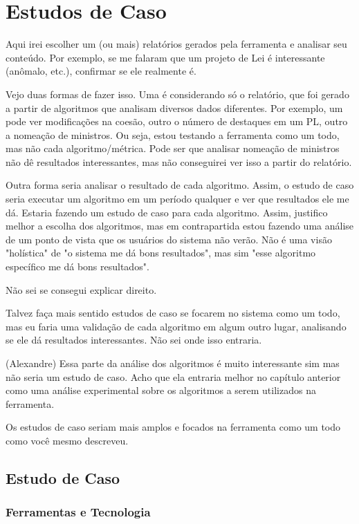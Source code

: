 \chapter{Estudos de Caso}\label{cap:avalia}

Aqui irei escolher um (ou mais) relatórios gerados pela ferramenta e analisar seu conteúdo. Por exemplo, se me falaram que um projeto de Lei é interessante (anômalo, etc.), confirmar se ele realmente é.

Vejo duas formas de fazer isso. Uma é considerando só o relatório, que foi gerado a partir de algoritmos que analisam diversos dados diferentes. Por exemplo, um pode ver modificações na coesão, outro o número de destaques em um PL, outro a nomeação de ministros. Ou seja, estou testando a ferramenta como um todo, mas não cada algoritmo/métrica. Pode ser que analisar nomeação de ministros não dê resultados interessantes, mas não conseguirei ver isso a partir do relatório.

Outra forma seria analisar o resultado de cada algoritmo. Assim, o estudo de caso seria executar um algoritmo em um período qualquer e ver que resultados ele me dá. Estaria fazendo um estudo de caso para cada algoritmo. Assim, justifico melhor a escolha dos algoritmos, mas em contrapartida estou fazendo uma análise de um ponto de vista que os usuários do sistema não verão. Não é uma visão "holística" de "o sistema me dá bons resultados", mas sim "esse algoritmo específico me dá bons resultados".

Não sei se consegui explicar direito.

Talvez faça mais sentido estudos de caso se focarem no sistema como um todo, mas eu faria uma validação de cada algoritmo em algum outro lugar, analisando se ele dá resultados interessantes. Não sei onde isso entraria.

(Alexandre) Essa parte da análise dos algoritmos é muito interessante sim mas não seria um estudo de caso. Acho que ela entraria melhor no capítulo anterior como uma análise experimental sobre os algoritmos a serem utilizados na ferramenta.

Os estudos de caso seriam mais amplos e focados na ferramenta como um todo como você mesmo descreveu.



\section{Estudo de Caso}

\subsection{Ferramentas e Tecnologia}
